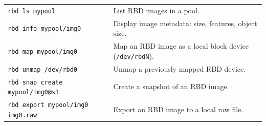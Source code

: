 \begin{longtable}{p{4cm} p{8cm}}
\texttt{rbd ls mypool} & List RBD images in a pool. \\
\texttt{rbd info mypool/img0} & Display image metadata: size, features, object size. \\
\texttt{rbd map mypool/img0} & Map an RBD image as a local block device (\texttt{/dev/rbdN}). \\
\texttt{rbd unmap /dev/rbd0} & Unmap a previously mapped RBD device. \\
\texttt{rbd snap create mypool/img0@s1} & Create a snapshot of an RBD image. \\
\texttt{rbd export mypool/img0 img0.raw} & Export an RBD image to a local raw file. \\
\bottomrule
\end{longtable}
